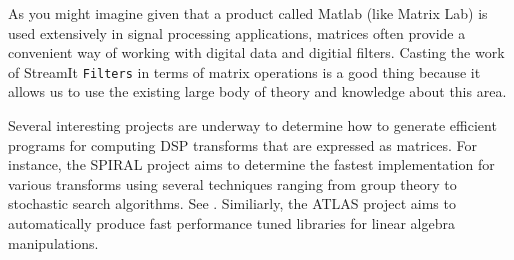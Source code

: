 As you might imagine given that a product called Matlab (like Matrix Lab) is used extensively
in signal processing applications, matrices often provide a convenient way of working with
digital data and digitial filters. Casting the work of StreamIt {\tt Filters} in terms 
of matrix operations is a good thing because it allows us to use the existing large body
of theory and knowledge about this area. 

Several interesting projects are underway to determine how to generate efficient programs
for computing DSP transforms that are expressed as matrices. For instance, the SPIRAL
project\cite{spiral} aims to determine the fastest implementation for various transforms
using several techniques ranging from group theory to stochastic search algorithms. See
 \cite{xiong-thesis,xiong01spl,johnson01searching,egner01automatic}.
Similiarly, the ATLAS project \cite{whaley01automated} aims to automatically produce fast
performance tuned libraries for linear algebra manipulations.
